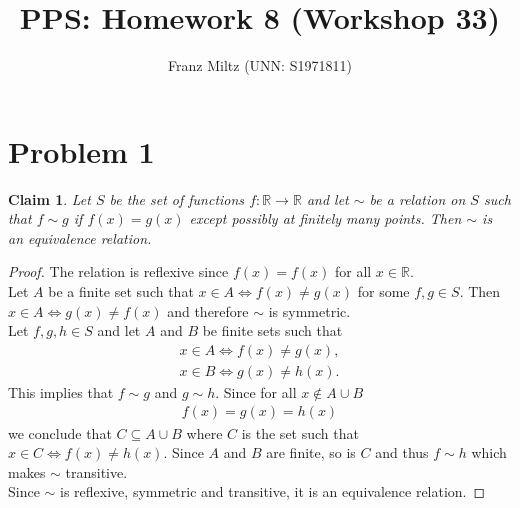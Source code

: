 \documentclass{article}
\title{PPS: Homework 8 (Workshop 33)}
\author{Franz Miltz (UNN: S1971811)}
\newcommand{\R}{\mathbb{R}}
\newtheorem{claim}[section]{Claim}
\begin{document}
\maketitle
\section*{Problem 1}
\begin{claim}
  Let $S$ be the set of functions $f:\R\to\R$ and let $\sim$ be a relation on $S$ such that $f\sim g$ if $f(x)=g(x)$ except possibly at finitely many points. 
  Then $\sim$ is an equivalence relation.
\end{claim}
\begin{proof}
  The relation is reflexive since $f(x)=f(x)$ for all $x\in\R$.\\
  Let $A$ be a finite set such that 
  $
    x \in A \Leftrightarrow f(x)\not= g(x)
  $
  for some $f,g\in S$.
  Then 
  $
    x\in A \Leftrightarrow g(x)\not=f(x)
  $
  and therefore $\sim$ is symmetric.\\
  Let $f,g,h \in S$ and let $A$ and $B$ be finite sets such that 
  \begin{align*}
    x\in A \Leftrightarrow f(x)\not= g(x),\\
    x\in B \Leftrightarrow g(x)\not= h(x).
  \end{align*}
  This implies that $f\sim g$ and $g\sim h$. Since for all $x\not\in A\cup B$
  \begin{align*}
    f(x)=g(x)=h(x)
  \end{align*}
  we conclude that $C\subseteq A \cup B$ where $C$ is the set such that $x\in C \Leftrightarrow f(x)\not=h(x)$. 
  Since $A$ and $B$ are finite, so is $C$ and thus $f\sim h$ which makes $\sim$ transitive.\\
  Since $\sim$ is reflexive, symmetric and transitive, it is an equivalence relation.
\end{proof}
\end{document}
